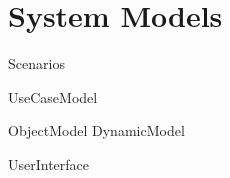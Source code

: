 \section{System Models}

{Scenarios}

{UseCaseModel}

{ObjectModel}
\pagebreak
{DynamicModel}

{UserInterface}
